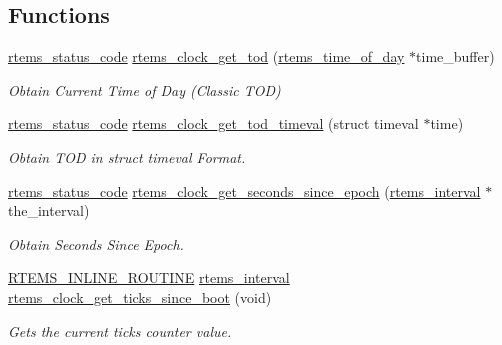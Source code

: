 \subsection*{Functions}
\begin{DoxyCompactItemize}
\item 
\mbox{\hyperlink{group__ClassicStatus_ga545d41846817eaba6143d52ee4d9e9fe}{rtems\+\_\+status\+\_\+code}} \mbox{\hyperlink{group__ClassicClock_gab393605047b6f9a1f400eac9205b5e2e}{rtems\+\_\+clock\+\_\+get\+\_\+tod}} (\mbox{\hyperlink{structrtems__time__of__day}{rtems\+\_\+time\+\_\+of\+\_\+day}} $\ast$time\+\_\+buffer)
\begin{DoxyCompactList}\small\item\em Obtain Current Time of Day (Classic T\+OD) \end{DoxyCompactList}\item 
\mbox{\hyperlink{group__ClassicStatus_ga545d41846817eaba6143d52ee4d9e9fe}{rtems\+\_\+status\+\_\+code}} \mbox{\hyperlink{group__ClassicClock_ga4c42801d9c3b97560a4d83b12c34c54a}{rtems\+\_\+clock\+\_\+get\+\_\+tod\+\_\+timeval}} (struct timeval $\ast$time)
\begin{DoxyCompactList}\small\item\em Obtain T\+OD in struct timeval Format. \end{DoxyCompactList}\item 
\mbox{\hyperlink{group__ClassicStatus_ga545d41846817eaba6143d52ee4d9e9fe}{rtems\+\_\+status\+\_\+code}} \mbox{\hyperlink{group__ClassicClock_ga10b180e0af7dd148c725a12bc72cfe2c}{rtems\+\_\+clock\+\_\+get\+\_\+seconds\+\_\+since\+\_\+epoch}} (\mbox{\hyperlink{group__ClassicTasks_gad39c43f949683d46874e3a5586b93aee}{rtems\+\_\+interval}} $\ast$the\+\_\+interval)
\begin{DoxyCompactList}\small\item\em Obtain Seconds Since Epoch. \end{DoxyCompactList}\item 
\mbox{\hyperlink{group__RTEMSScoreBaseDefs_gac216239df231d5dbd15e3520b0b9313f}{R\+T\+E\+M\+S\+\_\+\+I\+N\+L\+I\+N\+E\+\_\+\+R\+O\+U\+T\+I\+NE}} \mbox{\hyperlink{group__ClassicTasks_gad39c43f949683d46874e3a5586b93aee}{rtems\+\_\+interval}} \mbox{\hyperlink{group__ClassicClock_ga7a202d9cc133baaf3514b1e8b9eea357}{rtems\+\_\+clock\+\_\+get\+\_\+ticks\+\_\+since\+\_\+boot}} (void)
\begin{DoxyCompactList}\small\item\em Gets the current ticks counter value. \end{DoxyCompactList}\item 

\end{DoxyCompactItemize}
